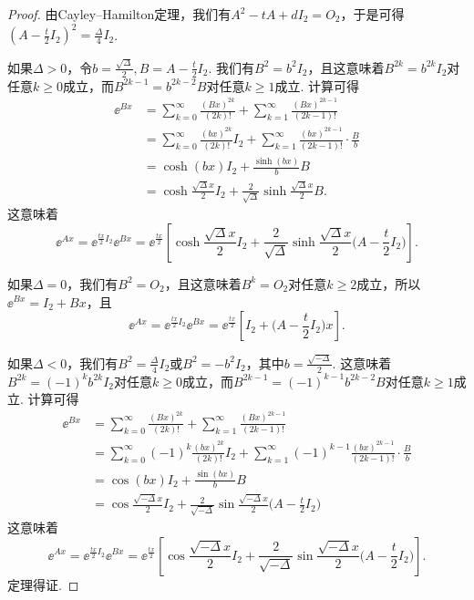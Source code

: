 \begin{proof}
  由Cayley--Hamilton定理，我们有$A^2-tA+dI_2=O_2$，于是可得$\left(A - \frac t2I_2\right)^2=\frac{\varDelta}4I_2$.

  如果$\varDelta>0$，令$b=\frac{\sqrt{\varDelta}}2,B=A-\frac t2I_2$. 我们有$B^2=b^2I_2$，且这意味着$B^{2k}=b^{2k}I_2$对任意$k\ge0$成立，而$B^{2k-1}=b^{2k-2}B$对任意$k\ge1$成立. 计算可得
  \begin{align*}
    \ee^{Bx} & = \sum_{k=0}^\infty \frac{(Bx)^{2k}}{(2k)!} + \sum_{k=1}^\infty \frac{(Bx)^{2k-1}}{(2k-1)!} \\
    & = \sum_{k=0}^\infty \frac{(bx)^{2k}}{(2k)!}I_2 + \sum_{k=1}^\infty \frac{(bx)^{2k-1}}{(2k-1)!}\cdot \frac Bb \\
    & = \cosh(bx)I_2 + \frac{\sinh(bx)}bB \\
    & = \cosh\frac{\sqrt\varDelta x}2I_2 + \frac2{\sqrt{\varDelta}}\sinh\frac{\sqrt\varDelta x}2B.
  \end{align*}
  这意味着
  \[
    \ee^{Ax} = \ee^{\frac{tx}2I_2} \ee^{Bx} =
    \ee^{\frac{tx}2} \left[ \cosh\frac{\sqrt\varDelta x}2I_2 + \frac2{\sqrt{\varDelta}}\sinh\frac{\sqrt\varDelta x}2\Big( A - \frac t2I_2 \Big) \right].
  \]

  如果$\varDelta=0$，我们有$B^2=O_2$，且这意味着$B^k=O_2$对任意$k\ge2$成立，所以$\ee^{Bx}=I_2+Bx$，且
  \[
    \ee^{Ax} = \ee^{\frac{tx}2I_2} \ee^{Bx} = \ee^{\frac{tx}2} \left[ I_2 + \Big( A - \frac t2I_2 \Big)x \right].
  \]

  如果$\varDelta<0$，我们有$B^2=\frac{\varDelta}4I_2$或$B^2=-b^2I_2$，其中$b=\frac{\sqrt{-\varDelta}}2$. 这意味着$B^{2k}=(-1)^kb^{2k}I_2$对任意$k\ge0$成立，而$B^{2k-1}=(-1)^{k-1}b^{2k-2}B$对任意$k\ge1$成立. 计算可得
  \begin{align*}
    \ee^{Bx} & = \sum_{k=0}^\infty \frac{(Bx)^{2k}}{(2k)!} + \sum_{k=1}^\infty \frac{(Bx)^{2k-1}}{(2k-1)!} \\
    & = \sum_{k=0}^\infty (-1)^k\frac{(bx)^{2k}}{(2k)!}I_2 + \sum_{k=1}^\infty(-1)^{k-1} \frac{(bx)^{2k-1}}{(2k-1)!}\cdot \frac Bb \\
    & = \cos(bx)I_2 + \frac{\sin(bx)}bB \\
    & = \cos\frac{\sqrt{-\varDelta} x}2I_2 + \frac2{\sqrt{-\varDelta}}\sin
        \frac{\sqrt{-\varDelta} x}2\Big( A - \frac t2I_2 \Big)
  \end{align*}
  这意味着
  \[
    \ee^{Ax} = \ee^{\frac{tx}2I_2} \ee^{Bx} =
    \ee^{\frac{tx}2} \left[ \cos\frac{\sqrt{-\varDelta} x}2I_2 + \frac2{\sqrt{-\varDelta}}\sin
        \frac{\sqrt{-\varDelta} x}2\Big( A - \frac t2I_2 \Big) \right].
  \]
  定理得证.
\end{proof}

